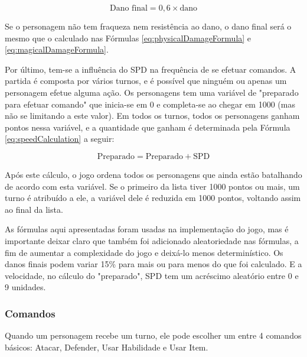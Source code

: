 \documentclass[12pt,a4paper]{article}
\begin{document}
	\begin{equation}
		\textrm{Dano final} = 0,6 \times \textrm{dano}
		\label{eq:damageReduction}
	\end{equation}
	
	\vspace{3mm}
	
	Se o personagem não tem fraqueza nem resistência ao dano,
	o dano final será o mesmo que o calculado nas Fórmulas \eqref{eq:physicalDamageFormula} e \eqref{eq:magicalDamageFormula}.
	
	Por último, tem-se a influência do SPD na frequência de se efetuar comandos.
	A partida é composta por vários turnos,
	e é possível que ninguém ou apenas um personagem efetue alguma ação.
	Os personagens tem uma variável de "preparado para efetuar comando"{} que inicia-se em 0 e completa-se ao chegar em 1000
	(mas não se limitando a este valor).
	Em todos os turnos, todos os personagens ganham pontos nessa variável,
	e a quantidade que ganham é determinada pela Fórmula \eqref{eq:speedCalculation} a seguir:
	
	\begin{equation}
		\textrm{Preparado} = \textrm{Preparado} + \textrm{SPD}
		\label{eq:speedCalculation}
	\end{equation}
	
	\vspace{3mm}
	
	Após este cálculo,
	o jogo ordena todos os personagens que ainda estão batalhando de acordo com esta variável.
	Se o primeiro da lista tiver 1000 pontos ou mais, um turno é atribuído a ele,
	a variável dele é reduzida em 1000 pontos,
	voltando assim ao final da lista.
	
	As fórmulas aqui apresentadas foram usadas na implementação do jogo,
	mas é importante deixar claro que também foi adicionado aleatoriedade nas fórmulas,
	a fim de aumentar a complexidade do jogo e deixá-lo menos determinístico.
	Os danos finais podem variar 15\% para mais ou para menos do que foi calculado.
	E a velocidade, no cálculo do "preparado"{}, SPD tem um acréscimo aleatório entre 0 e 9 unidades.
	
	\subsubsection{Comandos}
	Quando um personagem recebe um turno,
	ele pode escolher um entre 4 comandos básicos:
	Atacar, Defender, Usar Habilidade e Usar Item.
	
\end{document}
